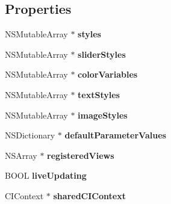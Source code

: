 \subsection*{Properties}
\begin{DoxyCompactItemize}
\item 
\hypertarget{interface_d_y_n_manager_a8d9baac10d0d85f68297bb5ac1acece2}{N\-S\-Mutable\-Array $\ast$ {\bfseries styles}}\label{interface_d_y_n_manager_a8d9baac10d0d85f68297bb5ac1acece2}

\item 
\hypertarget{interface_d_y_n_manager_aa5f435128649a81ae46164f7dfc2b8c6}{N\-S\-Mutable\-Array $\ast$ {\bfseries slider\-Styles}}\label{interface_d_y_n_manager_aa5f435128649a81ae46164f7dfc2b8c6}

\item 
\hypertarget{interface_d_y_n_manager_ad52ce0b959ef8041d33eab14fc4dce9f}{N\-S\-Mutable\-Array $\ast$ {\bfseries color\-Variables}}\label{interface_d_y_n_manager_ad52ce0b959ef8041d33eab14fc4dce9f}

\item 
\hypertarget{interface_d_y_n_manager_a180622986527a63ff02e37ec08a4c26c}{N\-S\-Mutable\-Array $\ast$ {\bfseries text\-Styles}}\label{interface_d_y_n_manager_a180622986527a63ff02e37ec08a4c26c}

\item 
\hypertarget{interface_d_y_n_manager_af97d480c2a6792d12cfb35434e648668}{N\-S\-Mutable\-Array $\ast$ {\bfseries image\-Styles}}\label{interface_d_y_n_manager_af97d480c2a6792d12cfb35434e648668}

\item 
\hypertarget{interface_d_y_n_manager_a892b20e4fdb18ba02b06fa7f73519537}{N\-S\-Dictionary $\ast$ {\bfseries default\-Parameter\-Values}}\label{interface_d_y_n_manager_a892b20e4fdb18ba02b06fa7f73519537}

\item 
\hypertarget{interface_d_y_n_manager_ac920a1475e459295e67851f1d2c02af5}{N\-S\-Array $\ast$ {\bfseries registered\-Views}}\label{interface_d_y_n_manager_ac920a1475e459295e67851f1d2c02af5}

\item 
\hypertarget{interface_d_y_n_manager_aedc8ccf167b63b4a13380dccc6b0f44e}{B\-O\-O\-L {\bfseries live\-Updating}}\label{interface_d_y_n_manager_aedc8ccf167b63b4a13380dccc6b0f44e}

\item 
\hypertarget{interface_d_y_n_manager_ae4f0a6fcf60796e773eb97c81e85a507}{C\-I\-Context $\ast$ {\bfseries shared\-C\-I\-Context}}\label{interface_d_y_n_manager_ae4f0a6fcf60796e773eb97c81e85a507}

\end{DoxyCompactItemize}


